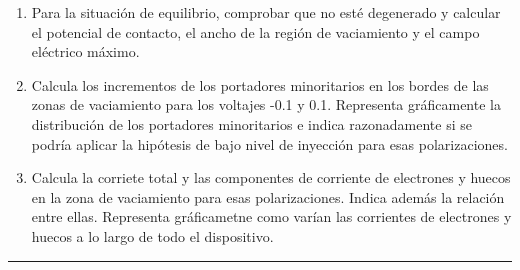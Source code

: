 \begin{enumerate}[label=\alph*)]
    \item Para la situación de equilibrio, comprobar que no esté degenerado y calcular el potencial de contacto, el ancho de la región de vaciamiento y el campo eléctrico máximo.
    \item Calcula los incrementos de los portadores minoritarios en los bordes de las zonas de vaciamiento para los voltajes -0.1 y 0.1. Representa gráficamente la distribución de los portadores minoritarios e indica razonadamente si se podría aplicar la hipótesis de bajo nivel de inyección para esas polarizaciones.
    \item Calcula la corriete total y las componentes de corriente de electrones y huecos en la zona de vaciamiento para esas polarizaciones. Indica además la relación entre ellas. Representa gráficametne como varían las corrientes de electrones y huecos a lo largo de todo el dispositivo. 
\end{enumerate}

\rule{\textwidth}{0.1pt} \\[2pt]


